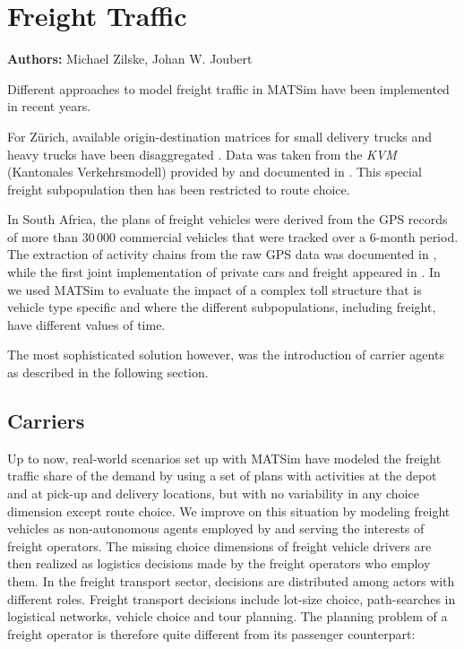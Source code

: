 \chapter{Freight Traffic}
\label{ch:freight}

\hfill \textbf{Authors:} Michael Zilske, Johan W. Joubert


Different approaches to model freight traffic in MATSim have been implemented in recent years. 

For Zürich, available origin-destination matrices for small delivery trucks and heavy trucks have been disaggregated \citet[][]{ShahM_TechRep_IVT_2010}. Data was taken from the \emph{KVM} (Kantonales Verkehrsmodell) provided by \citet{AMV_Webpage_2011} and documented in \citet[][]{GottardiBuergler_SV_1999}. This special freight subpopulation then has been restricted to route choice.

In South Africa, the plans of freight vehicles were derived from the GPS records of more than 30\,000 commercial vehicles that were tracked over a 6-month period. The extraction of activity chains from the raw GPS data was documented in \citet[][]{JoubertAxhausen_JTG_2011}, while the first joint implementation of private cars and freight appeared in \citet[][]{JoubertJEtAl_TRR_2010}. In \citet[][]{NagelKickhoeferJoubert2014HeterogeneousVoTsPROCEDIA} we used MATSim to evaluate the impact of a complex toll structure that is vehicle type specific and where the different subpopulations, including freight, have different values of time.

The most sophisticated solution however, was the introduction of carrier agents as described in the following section. 

\section{Carriers}
\label{sec:carriers}
Up to now, real-world scenarios set up with MATSim have modeled the freight traffic share of
the demand by using a set of plans with activities at the depot and at pick-up and delivery
locations, but with no variability in any choice dimension except route choice. We improve on
this situation by modeling freight vehicles as non-autonomous agents employed by and serving
the interests of freight operators. The missing choice dimensions of freight vehicle drivers are
then realized as logistics decisions made by the freight operators who employ them. In the
freight transport sector, decisions are distributed among actors with different roles. Freight
transport decisions include lot-size choice, path-searches in logistical networks, vehicle choice
and tour planning. The planning problem of a freight operator is therefore quite different from
its passenger counterpart:

